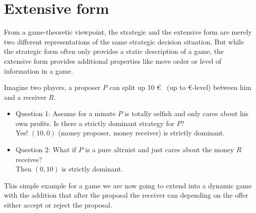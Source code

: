 

\section{Extensive form}

From a game-theoretic viewpoint, the strategic and the extensive form are merely two different representations of the same strategic decision situation. But while the strategic form often only provides a static description of a game, the extensive form provides additional properties like move order or level of information in a game.

\begin{example} \label{Dictator-Game} 
Imagine two players, a proposer $P$ can split up 10 \euro ~ (up to \euro-level) between him and a receiver $R$. 
	\begin{itemize}
		\item Question 1: Assume for a minute $P$ is totally selfish and only cares about his own profits. Is there a strictly dominant strategy for $P$? \\
			Yes! $(10, 0)$ (money proposer, money receiver) is strictly dominant.
		\item Question 2: What if $P$ is a pure altruist and just cares about the money $R$ receives? \\
			Then $(0, 10)$ is strictly dominant.
	\end{itemize}
\end{example}

This simple example for a game we are now going to extend into a dynamic game with the addition that after the proposal the receiver can depending on the offer either accept or reject the proposal.

